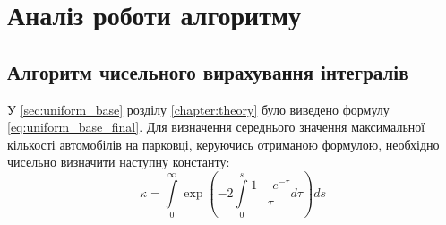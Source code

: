 \section{Аналіз роботи алгоритму}
\jointitles
\subsection{Алгоритм чисельного вирахування інтегралів}

У \ref{sec:uniform_base} розділу \ref{chapter:theory} було виведено формулу \eqref{eq:uniform_base_final}.
Для визначення середнього значення максимальної кількості автомобілів на парковці, керуючись отриманою формулою, необхідно чисельно визначити наступну константу:
\begin{equation}
\kappa =  \int\limits_0^\infty \exp\left( -2\int\limits_0^s \frac{1 - e^{-\tau}}{\tau} d\tau  \right) ds
\end{equation}

